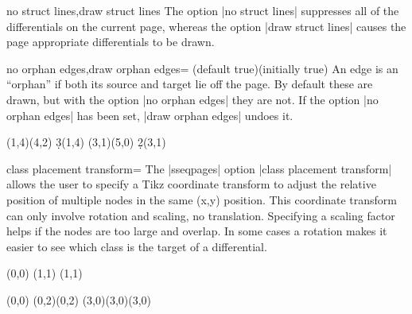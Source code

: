 \documentclass{ltxdoc}
\begin{document}
\begin{sseqdata}[name=ex1,degree={#1}{1-#1}]
\begin{keylist}{no struct lines,draw struct lines}
The option |no struct lines| suppresses all of the differentials on the current page, whereas the option |draw struct lines| causes the page appropriate differentials to be drawn.
\end{keylist}

\begin{keylist}{no orphan edges,draw orphan edges= (default true)(initially true)}
An edge is an ``orphan'' if both its source and target lie off the page. By default these are drawn, but with the option |no orphan edges| they are not. If the option |no orphan edges| has been set, |draw orphan edges| undoes it.
\begin{codeexample}[]
\begin{sseqdata}[name=orphan edges example,cohomological Serre grading,
                x range={0}{3}, y range={0}{3}]
\class(1,4)\class(4,2)
\d3(1,4)
\class(3,1)\class(5,0)
\d2(3,1)
\end{sseqdata}
\printpage[name=orphan edges example]
\hskip1cm
\printpage[name=orphan edges example,no orphan edges]
\end{codeexample}
\end{keylist}


\begin{key}{class placement transform=}
The |sseqpages| option |class placement transform| allows the user to specify a Tikz coordinate transform to adjust the relative position of multiple nodes in the same (x,y) position. This coordinate transform can only involve rotation and scaling, no translation. Specifying a scaling factor helps if the nodes are too large and overlap. In some cases a rotation makes it easier to see which class is the target of a differential.
\begin{codeexample}[width=5cm]
\begin{sseqpage}[classes={draw=none},class placement transform={xscale=3}, math nodes,
                 xscale=2, x axis extend end=0.7cm]
\class["\mathbb{Z}"](0,0)
\class["\mathbb{Z}/2"](1,1)
\class["\mathbb{Z}/3"](1,1)
\end{sseqpage}
\end{codeexample}
\begin{codeexample}[width=5cm]
\begin{sseqpage}[classes=fill,class placement transform={rotate=40},
                 cohomological Serre grading,differentials=blue,scale=0.7]
\class(0,0)
\class(0,2)\class(0,2)
\class[red](3,0)\class[green](3,0)\class[blue](3,0)


\end{sseqpage}
\end{codeexample}
\end{key}
\end{sseqdata}
\end{document}
